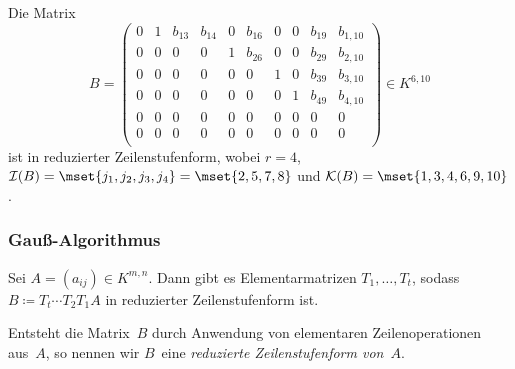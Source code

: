 \documentclass[a4paper]{article}
\begin{document}
\begin{example}\label{ex:redechelon}
    Die Matrix
    \begin{equation*}
        B = \begin{pmatrix}
            0 & 1 & b_{13} & b_{14} & 0 & b_{16} & 0 & 0 & b_{19} & b_{1, 10} \\
            0 & 0 & 0      & 0      & 1 & b_{26} & 0 & 0 & b_{29} & b_{2, 10} \\
            0 & 0 & 0      & 0      & 0 & 0      & 1 & 0 & b_{39} & b_{3, 10} \\
            0 & 0 & 0      & 0      & 0 & 0      & 0 & 1 & b_{49} & b_{4, 10} \\
            0 & 0 & 0      & 0      & 0 & 0      & 0 & 0 & 0      & 0         \\
            0 & 0 & 0      & 0      & 0 & 0      & 0 & 0 & 0      & 0         \\
        \end{pmatrix} \in K^{6, 10}
    \end{equation*}
    ist in reduzierter Zeilenstufenform, wobei $r = 4$, $\mathcal{I}(B) = \mset{j_1,j_2,j_3,j_4} = \mset{2, 5, 7, 8}$ und $\mathcal{K}(B) = \mset{1, 3, 4, 6, 9, 10}$.
\end{example}

\subsubsection{Gauß-Algorithmus}

\begin{theorem}
    Sei $A = (a_{ij}) \in K^{m,n}$. Dann gibt es Elementarmatrizen $T_1,\dots,T_t$, sodass $B \coloneqq T_t\cdots T_2T_1A$ in reduzierter Zeilenstufenform ist.
\end{theorem}

\begin{definition}
    Entsteht die Matrix~$B$ durch Anwendung von elementaren Zeilenoperationen aus~$A$, so nennen wir $B$~eine \emph{reduzierte Zeilenstufenform von~$A$}.
\end{definition}
\end{document}
